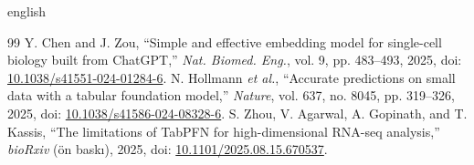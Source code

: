 \documentclass[conference]{IEEEtran}
\begin{document}
\begin{hyphenrules}{english}
\begin{thebibliography}{99}
 Y. Chen and J. Zou, ``Simple and effective embedding model for single-cell biology built from ChatGPT,'' \textit{Nat. Biomed. Eng.}, vol. 9, pp. 483--493, 2025, doi: \url{10.1038/s41551-024-01284-6}.
 N. Hollmann \textit{et al.}, ``Accurate predictions on small data with a tabular foundation model,'' \textit{Nature}, vol. 637, no. 8045, pp. 319--326, 2025, doi: \url{10.1038/s41586-024-08328-6}.
 S. Zhou, V. Agarwal, A. Gopinath, and T. Kassis, ``The limitations of TabPFN for high-dimensional RNA-seq analysis,'' \textit{bioRxiv} (ön baskı), 2025, doi: \url{10.1101/2025.08.15.670537}.
\end{thebibliography}
\end{hyphenrules}
\end{document}
